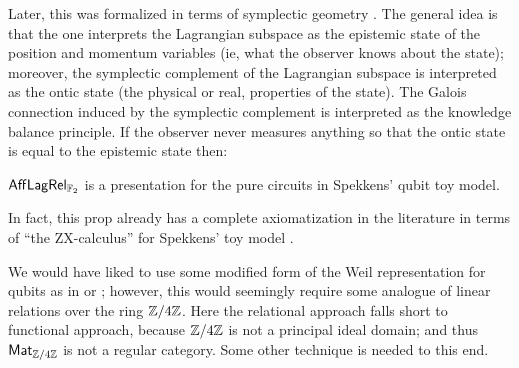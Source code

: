 Later, this was formalized in terms of symplectic geometry \cite{spekkens2016quasi}. %
 The general idea is that the one interprets the Lagrangian subspace as the epistemic state of the position and momentum variables (ie, what the observer knows about the state); moreover, the symplectic complement of the Lagrangian subspace is interpreted as the ontic state (the physical or real, properties of the state).  The Galois connection induced by the symplectic complement is interpreted as the knowledge balance principle.  If the observer never measures anything so that the ontic state is equal to the epistemic state then:
\begin{corollary}
$\mathsf{Aff}\mathsf{Lag}\mathsf{Rel}_{\mathbb{F}_2}$ is a presentation for the pure circuits in Spekkens' qubit toy model.
\end{corollary}
In fact, this prop  already has a complete axiomatization in the literature in terms of ``the ZX-calculus'' for Spekkens' toy model \cite{backensspek}. %

We would have liked to use some modified form of the Weil representation for qubits as in \cite[\S 3.3]{heinrich2021stabiliser} or \cite{niel}; however, this would seemingly require some analogue of linear relations over the ring $\mathbb{Z}/4\mathbb{Z}$.   Here the relational approach falls short to functional approach, because ${\mathbb{Z}/4\mathbb{Z}}$  is not a principal ideal domain; and thus  $\mathsf{Mat}_{\mathbb{Z}/4\mathbb{Z}}$  is not a regular category.  Some other technique is needed to this end.



